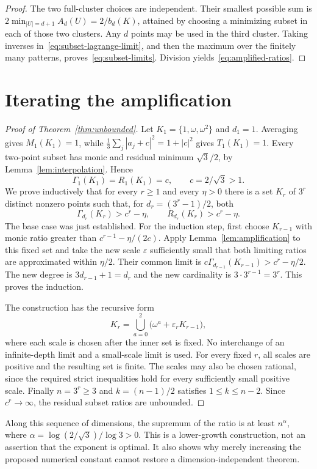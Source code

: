 \documentclass[11pt,a4paper]{article}
\theoremstyle{remark}
\newcommand{\eps}{\varepsilon}
\newcommand{\om}{\omega}
\begin{document}
\begin{proof}
The two full-cluster choices are independent. Their smallest possible sum
is $2\min_{|U|=d+1}A_d(U)=2/b_d(K)$, attained by choosing a minimizing subset
in each of those two clusters. Any $d$ points may be used in the third cluster.
Taking inverses in~\eqref{eq:subset-lagrange-limit}, and then the maximum over
the finitely many patterns, proves~\eqref{eq:subset-limits}.
Division yields~\eqref{eq:amplified-ratios}.
\end{proof}

\section{Iterating the amplification}
\begin{proof}[Proof of Theorem~\ref{thm:unbounded}]
Let $K_1=\{1,\om,\om^2\}$ and $d_1=1$.
Averaging gives $M_1(K_1)=1$, while
$\frac13\sum_j|a_j+c|^2=1+|c|^2$ gives $T_1(K_1)=1$.
Every two-point subset has monic and residual minimum $\sqrt3/2$, by
Lemma~\ref{lem:interpolation}. Hence
\[
 \Gamma_1(K_1)=R_1(K_1)=c,\qquad c=2/\sqrt3>1.
\]
We prove inductively that for every $r\ge1$ and every $\eta>0$ there is a set
$K_r$ of $3^r$ distinct nonzero points such that, for
$d_r=(3^r-1)/2$, both
\[
 \Gamma_{d_r}(K_r)>c^r-\eta,
 \qquad R_{d_r}(K_r)>c^r-\eta.
\]
The base case was just established. For the induction step, first choose
$K_{r-1}$ with monic ratio greater than
$c^{r-1}-\eta/(2c)$. Apply Lemma~\ref{lem:amplification} to this fixed set
and take the new scale $\eps$ sufficiently small that both limiting ratios
are approximated within $\eta/2$.
Their common limit is $c\Gamma_{d_{r-1}}(K_{r-1})>c^r-\eta/2$.
The new degree is
$3d_{r-1}+1=d_r$ and the new cardinality is $3\cdot3^{r-1}=3^r$.
This proves the induction.

The construction has the recursive form
\[
 K_r=\bigcup_{a=0}^2\bigl(\om^a+\eps_r K_{r-1}\bigr),
\]
where each scale is chosen after the inner set is fixed. No interchange of
an infinite-depth limit and a small-scale limit is used.
For every fixed $r$, all scales are positive and the resulting set is finite.
The scales may also be chosen rational, since the required strict inequalities
hold for every sufficiently small positive scale.
Finally $n=3^r\ge3$ and $k=(n-1)/2$ satisfies $1\le k\le n-2$.
Since $c^r\to\infty$, the residual subset ratios are unbounded.
\end{proof}

Along this sequence of dimensions, the supremum of the ratio is at least
$n^{\alpha}$, where $\alpha=\log(2/\sqrt3)/\log3>0$.
This is a lower-growth construction, not an assertion that the exponent is
optimal. It also shows why merely increasing the proposed numerical constant
cannot restore a dimension-independent theorem.
\end{document}
